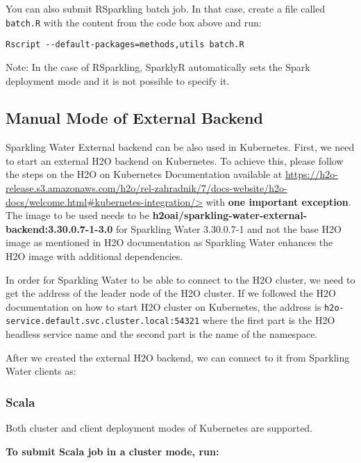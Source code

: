 You can also submit RSparkling batch job. In that case, create a file called \texttt{batch.R} with the content
from the code box above and run:

\begin{lstlisting}[style=Bash]
Rscript --default-packages=methods,utils batch.R
\end{lstlisting}

Note: In the case of RSparkling, SparklyR automatically sets the Spark deployment mode and it is not possible to specify it.

\subsection{Manual Mode of External Backend}

Sparkling Water External backend can be also used in Kubernetes. First, we need to start
an external H2O backend on Kubernetes. To achieve this, please follow the steps on the
H2O on Kubernetes Documentation available at \url{https://h2o-release.s3.amazonaws.com/h2o/rel-zahradnik/7/docs-website/h2o-docs/welcome.html#kubernetes-integration/>} with
\textbf{one important exception}. The image to be used needs to be \textbf{h2oai/sparkling-water-external-backend:3.30.0.7-1-3.0} for Sparkling Water 3.30.0.7-1 and
not the base H2O image as mentioned in H2O documentation as Sparkling Water enhances the H2O image with additional dependencies.

In order for Sparkling Water to be able to connect to the H2O cluster, we need to get the address of the leader node
of the H2O cluster. If we followed the H2O documentation on how to start H2O cluster on Kubernetes, the address is
\texttt{h2o-service.default.svc.cluster.local:54321} where the first part is the H2O headless service name and the
second part is the name of the namespace.

After we created the external H2O backend, we can connect to it from Sparkling Water clients as:

\subsubsection{Scala}

Both cluster and client deployment modes of Kubernetes are supported.

\textbf{To submit Scala job in a cluster mode, run:}

